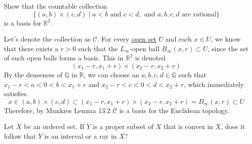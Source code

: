   \begin{exercise}[Munkres 16.6]
    Show that the countable collection
    \begin{equation}
      \{(a,b) \times (c,d) \mid a < b \text{ and } c < d, \text{ and } a,b,c,d \text{ are rational}\}
    \end{equation}
    is a basis for $\mathbb{R}^2$.
  \end{exercise}
  \begin{solution}[Munkres 16.6]
    Let's denote the collection as $\mathcal{C}$. For every \hyperref[def:open-set]{open set} $U$ and each $x \in U$, we know that there exists a $r > 0$ such that the $L_\infty$-open ball $B_\infty (x, r) \subset U$, since the set of such open balls forms a basis. This in $\mathbb{R}^2$ is denoted 
    \begin{equation}
      (x_1 - r, x_1 + r) \times (x_2 - r, x_2 + r)
    \end{equation}
    By the denseness of $\mathbb{Q}$ in $\mathbb{R}$, we can choose an $a, b, c, d \in \mathbb{Q}$ such that $x_1 - r < a < 0 < b < x_1 + r$ and $x_2 - r < c < 0 < d < x_2 + r$, which immediately satisfies. 
    \begin{equation}
      x \in (a, b) \times (c, d) \subset (x_1 - r, x_1 + r) \times (x_2 - r, x_2 + r) = B_\infty (x, r) \subset U
    \end{equation}
    Therefore, by Munkres Lemma 13.2 $\mathcal{C}$ is a basis for the Euclidean topology. 
  \end{solution}

  \begin{exercise}[Munkres 16.7]
    Let $X$ be an ordered set. If $Y$ is a proper subset of $X$ that is convex in $X$, does it follow that $Y$ is an interval or a ray in $X$?
  \end{exercise}

